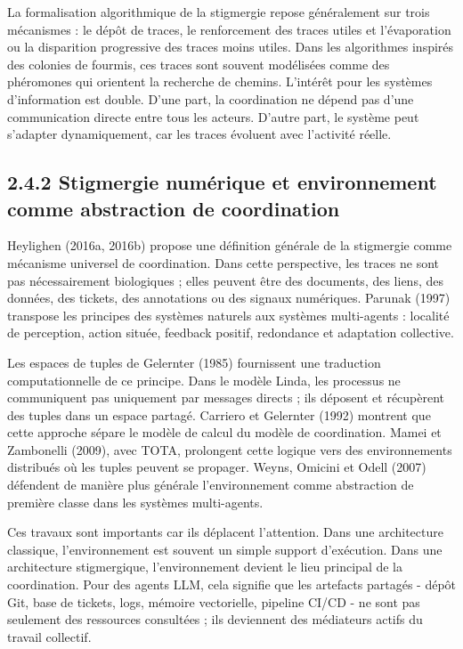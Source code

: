 La formalisation algorithmique de la stigmergie repose généralement sur trois mécanismes : le dépôt de traces, le renforcement des traces utiles et l'évaporation ou la disparition progressive des traces moins utiles. Dans les algorithmes inspirés des colonies de fourmis, ces traces sont souvent modélisées comme des phéromones qui orientent la recherche de chemins. L'intérêt pour les systèmes d'information est double. D'une part, la coordination ne dépend pas d'une communication directe entre tous les acteurs. D'autre part, le système peut s'adapter dynamiquement, car les traces évoluent avec l'activité réelle.

\subsection{2.4.2 Stigmergie numérique et environnement comme abstraction de coordination}\label{stigmergie-numuxe9rique-et-environnement-comme-abstraction-de-coordination}

Heylighen (2016a, 2016b) propose une définition générale de la stigmergie comme mécanisme universel de coordination. Dans cette perspective, les traces ne sont pas nécessairement biologiques ; elles peuvent être des documents, des liens, des données, des tickets, des annotations ou des signaux numériques. Parunak (1997) transpose les principes des systèmes naturels aux systèmes multi-agents : localité de perception, action située, feedback positif, redondance et adaptation collective.

Les espaces de tuples de Gelernter (1985) fournissent une traduction computationnelle de ce principe. Dans le modèle Linda, les processus ne communiquent pas uniquement par messages directs ; ils déposent et récupèrent des tuples dans un espace partagé. Carriero et Gelernter (1992) montrent que cette approche sépare le modèle de calcul du modèle de coordination. Mamei et Zambonelli (2009), avec TOTA, prolongent cette logique vers des environnements distribués où les tuples peuvent se propager. Weyns, Omicini et Odell (2007) défendent de manière plus générale l'environnement comme abstraction de première classe dans les systèmes multi-agents.

Ces travaux sont importants car ils déplacent l'attention. Dans une architecture classique, l'environnement est souvent un simple support d'exécution. Dans une architecture stigmergique, l'environnement devient le lieu principal de la coordination. Pour des agents LLM, cela signifie que les artefacts partagés - dépôt Git, base de tickets, logs, mémoire vectorielle, pipeline CI/CD - ne sont pas seulement des ressources consultées ; ils deviennent des médiateurs actifs du travail collectif.

